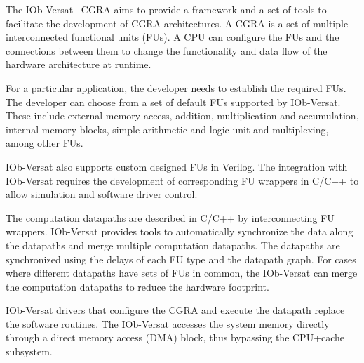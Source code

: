 The IOb-Versat~\cite{iob-versat} CGRA aims to provide a framework and a set of
tools to facilitate the development of CGRA architectures. A CGRA is a set of
multiple interconnected functional units (FUs). A CPU can configure the FUs and
the connections between them to change the functionality and data flow of the
hardware architecture at runtime.

For a particular application, the developer needs to establish the required
FUs. The developer can choose from a set of default FUs supported by
IOb-Versat. These include external memory access, addition, multiplication and
accumulation, internal memory blocks, simple arithmetic and logic unit and
multiplexing, among other FUs.

IOb-Versat also supports custom designed FUs in Verilog. The integration with
IOb-Versat requires the development of corresponding FU wrappers in C/C++ to
allow simulation and software driver control.

The computation datapaths are described in C/C++ by interconnecting FU
wrappers. IOb-Versat provides tools to automatically synchronize the data along
the datapaths and merge multiple computation datapaths. The datapaths are
synchronized using the delays of each FU type and the datapath graph. For cases
where different datapaths have sets of FUs in common, the IOb-Versat can merge
the computation datapaths to reduce the hardware footprint.

IOb-Versat drivers that configure the CGRA and execute the datapath replace the
software routines. The IOb-Versat accesses the system memory directly through a
direct memory access (DMA) block, thus bypassing the CPU+cache subsystem.
